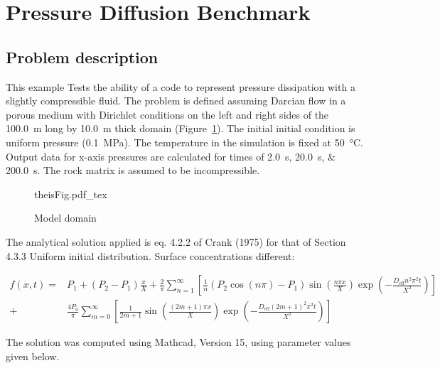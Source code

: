 \section{Pressure Diffusion Benchmark}
\subsection{Problem description}
This example Tests the ability of a code to represent pressure dissipation with a slightly compressible fluid. The problem is defined assuming Darcian flow in a porous medium with Dirichlet conditions on the left and right sides of the \SI[scientific-notation=false, round-precision=2]{100.0}{\metre} long by \SI[scientific-notation=false, round-precision=2]{10.0}{\metre} thick domain (Figure~\ref{fig:presDiffFig}). The initial initial condition is uniform pressure (\SI[scientific-notation=false, round-precision=2]{0.1}{\mega\pascal}). The temperature in the simulation is fixed at \SI[scientific-notation=false, round-precision=2]{50}{\degreeCelsius}. Output data for x-axis pressures are calculated for times of \SIlist[scientific-notation=false, round-precision=2]{2.0; 20.0; 200.0}{\second}. The rock matrix is assumed to be incompressible.

\begin{figure}[h]
	\centering
	{theisFig.pdf_tex}
	\caption{Model domain}
	\label{fig:presDiffFig}
\end{figure}

The analytical solution applied is eq. 4.2.2 of Crank (1975) for that of Section 4.3.3 Uniform initial distribution. Surface concentrations different:

\begin{align}
	f(x,t)=&P_1+ (P_2-P_1)\frac{x}{X}+\frac{2}{\pi}\sum_{n=1}^{\infty}\left[ \frac{1}{n}(P_2\cos(n\pi)-P_1)\sin \left( \frac{n\pi x}{X}\right)\exp \left( -\frac{D_{\text{eff}}n^2\pi^2 t}{X^2} \right) \right] \nonumber\\
	+& \frac{4 P_0}{\pi}\sum_{m=0}^{\infty}\left[ \frac{1}{2m+1}\sin\left( \frac{(2m+1)\pi x}{X} \right)\exp \left( -\frac{D_{\text{eff}}(2m+1)^2\pi^2 t}{X^2} \right) \right]
	\label{eq:anaPresDiff}
\end{align}

The solution was computed using Mathcad, Version 15, using parameter values given below.

